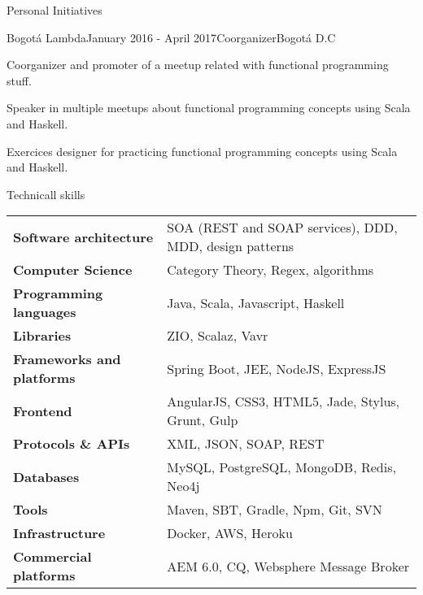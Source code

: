 \documentclass[spanish]{resume}
\begin{document}
\begin{rSection}{Personal Initiatives}

\begin{rSubsection}{Bogot\'a Lambda}{January 2016 - April 2017}{Coorganizer}{Bogot\'a D.C}
\item Coorganizer and promoter of a meetup related with functional programming stuff.
\item Speaker in multiple meetups about functional programming concepts using Scala and Haskell.
\item Exercices designer for practicing functional programming concepts using Scala and Haskell.
\end{rSubsection}

\end{rSection}



\begin{rSection}{Technicall skills}

\begin{tabular}{ @{} >{\bfseries}l @{\hspace{6ex}} l }
Software architecture & SOA (REST and SOAP services), DDD, MDD, design patterns \\
Computer Science & Category Theory, Regex, algorithms \\
Programming languages & Java, Scala, Javascript, Haskell\\
Libraries & ZIO, Scalaz, Vavr \\
Frameworks and platforms &  Spring Boot, JEE, NodeJS, ExpressJS \\
Frontend & AngularJS, CSS3, HTML5, Jade, Stylus, Grunt, Gulp \\
Protocols \& APIs & XML, JSON, SOAP, REST \\
Databases & MySQL, PostgreSQL, MongoDB, Redis, Neo4j \\
Tools & Maven, SBT, Gradle, Npm, Git, SVN \\
Infrastructure & Docker, AWS, Heroku \\
Commercial platforms & AEM 6.0, CQ, Websphere Message Broker \\

\end{tabular}

\end{rSection}
\end{document}
